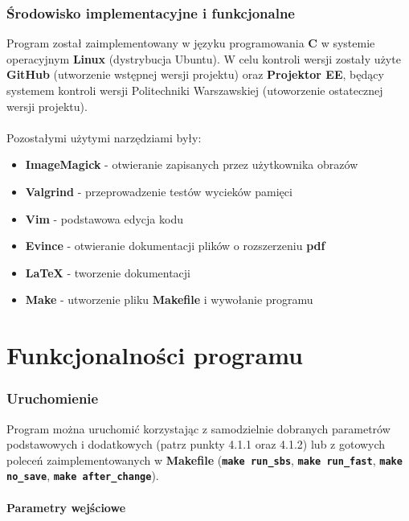 \documentclass[a4paper]{article}
\begin{document}
\section{\'Srodowisko implementacyjne i funkcjonalne}
\quad Program zosta\l{} zaimplementowany w j\k{e}zyku programowania \textbf{C} w systemie operacyjnym \textbf{Linux} (dystrybucja Ubuntu). 
W celu kontroli wersji zosta\l{}y u\.zyte \textbf{GitHub} (utworzenie wst\k{e}pnej wersji projektu) oraz \textbf{Projektor EE}, b\k{e}d\k{a}cy systemem kontroli wersji Politechniki Warszawskiej (utoworzenie ostatecznej wersji projektu). 
\\
\\
Pozosta\l{}ymi u\.zytymi narz\k{e}dziami by\l{}y:
\begin{itemize}
	\item \textbf{ImageMagick} - otwieranie zapisanych przez u\.zytkownika obraz\'ow
	\item \textbf{Valgrind} - przeprowadzenie test\'ow wyciek\'ow pami\k{e}ci
	\item \textbf{Vim} - podstawowa edycja kodu
	\item \textbf{Evince} - otwieranie dokumentacji plik\'ow o rozszerzeniu \textbf{pdf}
	\item \textbf{\LaTeX{}} - tworzenie dokumentacji
	\item \textbf{Make} - utworzenie pliku \textbf{Makefile} i wywo\l{}anie programu
\end{itemize}


\newpage
\part{Funkcjonalno\'sci programu}

\section{Uruchomienie}
\quad Program mo\.zna uruchomi\'c korzystaj\k{a}c z samodzielnie dobranych parametr\'ow podstawowych i dodatkowych (patrz punkty 4.1.1 oraz 4.1.2) 
lub z gotowych polece\'n zaimplementowanych w \textbf{Makefile} (\textbf{\texttt{make run\_sbs}}, \textbf{\texttt{make run\_fast}}, 
\textbf{\texttt{make no\_save}}, \textbf{\texttt{make after\_change}}).

\subsection{Parametry wej\'sciowe}
\end{document}
